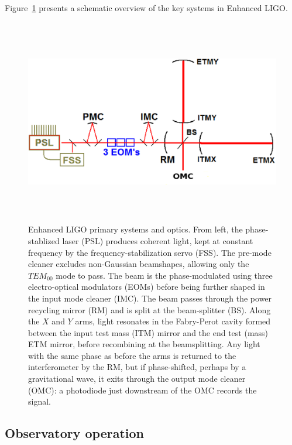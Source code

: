 Figure~\ref{primary_eLIGO_optics} presents a schematic overview of the key systems in Enhanced LIGO.

\begin{figure}
\begin{center}
\includegraphics[height=90mm,width=148mm]{LIGODiagramnew.eps}
\caption{Enhanced LIGO primary systems and optics. From left, the phase-stablized laser (PSL) produces coherent light, kept at constant frequency by the frequency-stabilization servo (FSS). The pre-mode cleaner excludes non-Gaussian beamshapes, allowing only the $TEM_{00}$ mode to pass. The beam is the phase-modulated using three electro-optical modulators (EOMs) before being further shaped in the input mode cleaner (IMC). The beam passes through the power recycling mirror (RM) and is split at the beam-splitter (BS). Along the $X$ and $Y$ arms, light resonates in the Fabry-Perot cavity formed between the input test mass (ITM) mirror and the end test (mass) ETM mirror, before recombining at the beamsplitting. Any light with the same phase as before the arms is returned to the interferometer by the RM, but if phase-shifted, perhaps by a gravitational wave, it exits through the output mode cleaner (OMC): a photodiode just downstream of the OMC records the signal.}
\label{primary_eLIGO_optics}
\end{center}
\end{figure}

            \subsection{Observatory operation}
            \label{observatory_operation}

